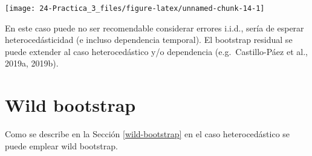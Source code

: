 \documentclass[
]{book}
\newenvironment{Shaded}{\begin{snugshade}}{\end{snugshade}}
\newcommand{\DataTypeTok}[1]{\textcolor[rgb]{0.13,0.29,0.53}{#1}}
\newcommand{\DecValTok}[1]{\textcolor[rgb]{0.00,0.00,0.81}{#1}}
\newcommand{\KeywordTok}[1]{\textcolor[rgb]{0.13,0.29,0.53}{\textbf{#1}}}
\newcommand{\NormalTok}[1]{#1}
\newcommand{\OperatorTok}[1]{\textcolor[rgb]{0.81,0.36,0.00}{\textbf{#1}}}
\newcommand{\StringTok}[1]{\textcolor[rgb]{0.31,0.60,0.02}{#1}}
\theoremstyle{definition}
\theoremstyle{definition}
\theoremstyle{definition}
\theoremstyle{remark}
\begin{document}
\begin{Shaded}
\end{Shaded}

\begin{center}\texttt{[image: 24-Practica\_3\_files/figure-latex/unnamed-chunk-14-1]} \end{center}

En este caso puede no ser recomendable considerar errores i.i.d.,
sería de esperar heterocedásticidad (e incluso dependencia temporal).
El bootstrap residual se puede extender al caso heterocedástico
y/o dependencia (e.g.~Castillo-Páez et al., 2019a, 2019b).

\hypertarget{p3-wild-bootstrap}{%
\section{Wild bootstrap}\label{p3-wild-bootstrap}}

Como se describe en la Sección \ref{wild-bootstrap}
en el caso heterocedástico se puede emplear wild bootstrap.
\end{document}
